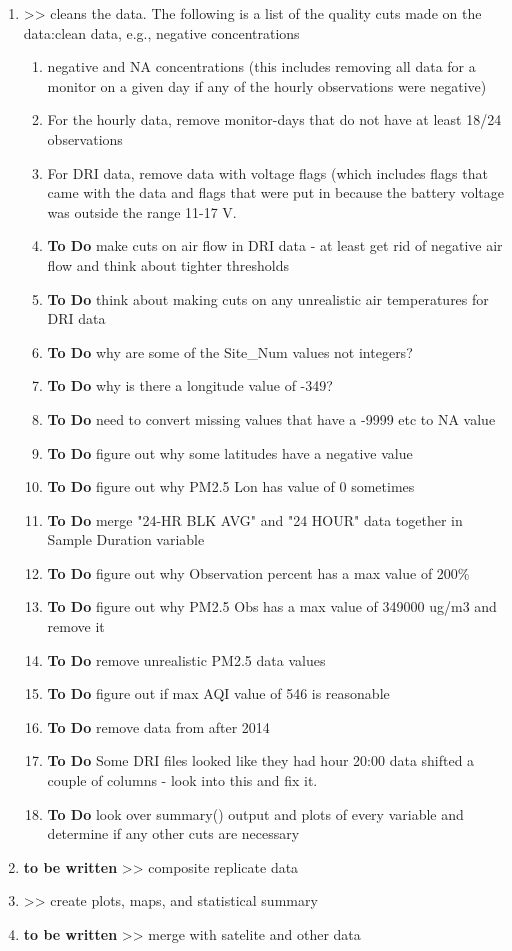 \begin{enumerate}[nolistsep]
\item {} >> cleans the data. The following is a list of the quality cuts made on the data:clean data, e.g., negative concentrations
	\begin{enumerate}[nolistsep]
	\item negative and NA concentrations (this includes removing all data for a monitor on a given day if any of the hourly observations were negative)
	\item For the hourly data, remove monitor-days that do not have at least 18/24 observations
	\item For DRI data, remove data with voltage flags (which includes flags that came with the data and flags that were put in because the battery voltage was outside the range 11-17 V.
	\item \textbf{To Do} make cuts on air flow in DRI data - at least get rid of negative air flow and think about tighter thresholds
	\item \textbf{To Do} think about making cuts on any unrealistic air temperatures for DRI data
	\item \textbf{To Do} why are some of the Site\_Num values not integers?
	\item \textbf{To Do} why is there a longitude value of -349?
	\item \textbf{To Do} need to convert missing values that have a -9999 etc to NA value
	\item \textbf{To Do} figure out why some latitudes have a negative value
	\item \textbf{To Do} figure out why PM2.5 Lon has value of 0 sometimes
	\item \textbf{To Do} merge "24-HR BLK AVG" and "24 HOUR" data together in Sample Duration variable
	\item \textbf{To Do} figure out why Observation percent has a max value of 200\%
	\item \textbf{To Do} figure out why PM2.5 Obs has a max value of 349000 ug/m3 and remove it
	\item \textbf{To Do} remove unrealistic PM2.5 data values
	\item \textbf{To Do} figure out if max AQI value of 546 is reasonable
	\item \textbf{To Do} remove data from after 2014
	\item \textbf{To Do} Some DRI files looked like they had hour 20:00 data shifted a couple of columns - look into this and fix it.
	\item \textbf{To Do} look over summary() output and plots of every variable and determine if any other cuts are necessary

	\end{enumerate}

\item \textbf{to be written} >> composite replicate data
\item {} >> create plots, maps, and statistical summary
\item \textbf{to be written} >> merge with satelite and other data
\end{enumerate}
